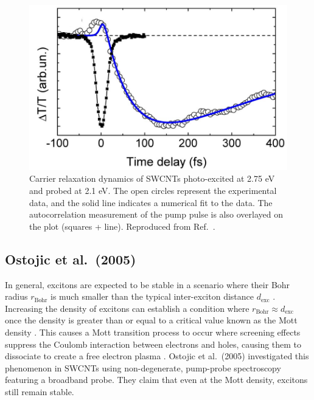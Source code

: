 \begin{figure}[ht]
	\centering
	\includegraphics[scale=1.3]{images/chapter_prior_works/e33_pump_e22_probe_manzoni}
	\caption{Carrier relaxation dynamics of SWCNTs photo-excited at 2.75 eV and probed at 2.1 eV. The open circles represent the experimental data, and the solid line indicates a numerical fit to the data. The autocorrelation measurement of the pump pulse is also overlayed on the plot (squares + line). Reproduced from Ref.\ \cite{manzoni2005intersubband}.}
	\label{fig:e33_pump_manzoni}
\end{figure}



\subsection{Ostojic et al.\ (2005)}

In general, excitons are expected to be stable in a scenario where their Bohr radius $r_\text{Bohr}$ is much smaller than the typical inter-exciton distance $d_\text{exc}$ \cite{mott1961transition}. Increasing the density of excitons can establish a condition where $r_\text{Bohr} \approx d_\text{exc}$ once the density is greater than or equal to a critical value known as the Mott density \cite{mott1961transition}. This causes a Mott transition process to occur where screening effects suppress the Coulomb interaction between electrons and holes, causing them to dissociate to create a free electron plasma \cite{mott1961transition}. Ostojic et al.\ (2005) investigated this phenomenon in SWCNTs using non-degenerate, pump-probe spectroscopy \cite{ostojic2005stability} featuring a broadband probe. They claim that even at the Mott density, excitons still remain stable.


